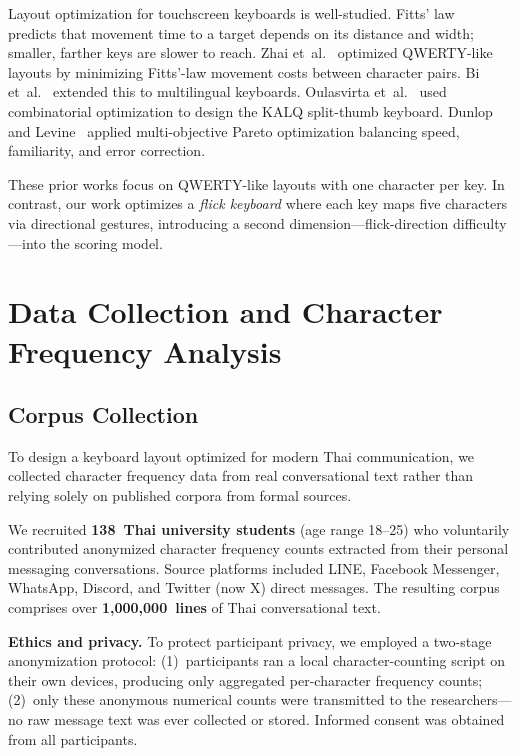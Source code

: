 \documentclass[10pt,twocolumn,a4paper]{article}
\begin{document}
Layout optimization for touchscreen keyboards is well-studied.
Fitts' law~\cite{fitts1954} predicts that movement time to a target depends on its distance and width; smaller, farther keys are slower to reach.
Zhai et~al.~\cite{zhai2002} optimized QWERTY-like layouts by minimizing Fitts'-law movement costs between character pairs.
Bi et~al.~\cite{bi2012} extended this to multilingual keyboards.
Oulasvirta et~al.~\cite{oulasvirta2013} used combinatorial optimization to design the KALQ split-thumb keyboard.
Dunlop and Levine~\cite{dunlop2012} applied multi-objective Pareto optimization balancing speed, familiarity, and error correction.

These prior works focus on QWERTY-like layouts with one character per key.
In contrast, our work optimizes a \emph{flick keyboard} where each key maps five characters via directional gestures, introducing a second dimension---flick-direction difficulty---into the scoring model.

\section{Data Collection and Character Frequency Analysis}
\label{sec:data}

\subsection{Corpus Collection}
\label{sec:data_corpus}

To design a keyboard layout optimized for modern Thai communication, we collected character frequency data from real conversational text rather than relying solely on published corpora from formal sources.

We recruited \textbf{138~Thai university students} (age range 18--25) who voluntarily contributed anonymized character frequency counts extracted from their personal messaging conversations.
Source platforms included LINE, Facebook Messenger, WhatsApp, Discord, and Twitter (now X) direct messages.
The resulting corpus comprises over \textbf{1,000,000~lines} of Thai conversational text.

\textbf{Ethics and privacy.}
To protect participant privacy, we employed a two-stage anonymization protocol:
(1)~participants ran a local character-counting script on their own devices, producing only aggregated per-character frequency counts;
(2)~only these anonymous numerical counts were transmitted to the researchers---no raw message text was ever collected or stored.
Informed consent was obtained from all participants.
\end{document}
